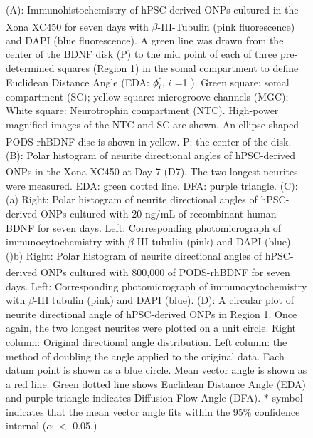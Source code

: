 \documentclass[review]{elsarticle}
\begin{document}
\begin{figure}
	\caption{(A): Immunohistochemistry of hPSC-derived ONPs cultured in the Xona\textsuperscript{\texttrademark} XC450 for seven days with $\beta$-III-Tubulin (pink fluorescence) and DAPI (blue fluorescence). A green line was drawn from the center of the BDNF disk (P) to the mid point of each of three pre-determined squares (Region 1) in the somal compartment to define Euclidean Distance Angle (EDA: $\phi^{`}_{i}$, $i$ =1 ). Green square: somal compartment (SC); yellow square:  microgroove channels (MGC); White square: Neurotrophin compartment (NTC). High-power magnified images of the NTC and SC are shown. An ellipse-shaped PODS\textsuperscript{\textregistered}-rhBDNF disc is shown in yellow. P: the center of the disk.(B): Polar histogram of  neurite directional angles of hPSC-derived ONPs in the Xona\textsuperscript{\texttrademark} XC450 at Day 7 (D7). The two longest neurites were measured. EDA: green dotted line. DFA: purple triangle. (C): (a) Right: Polar histogram of neurite directional angles of hPSC-derived ONPs cultured with 20 ng/mL of recombinant human BDNF for seven days. Left: Corresponding photomicrograph of immunocytochemistry with $\beta$-III tubulin (pink) and DAPI (blue). ()b) Right: Polar histogram of neurite directional angles of hPSC-derived ONPs cultured with 800,000 of PODS\textsuperscript{\textregistered}-rhBDNF for seven days. Left: Corresponding photomicrograph of immunocytochemistry with $\beta$-III tubulin (pink) and DAPI (blue). (D):  A circular plot of neurite directional angle of hPSC-derived ONPs in Region 1. Once again, the two longest neurites were plotted on a unit circle. Right column: Original directional angle distribution. Left column: the method of doubling the angle applied to the original data. Each datum point is shown as a blue circle. Mean vector angle is shown as a red line. Green dotted line shows Euclidean Distance Angle (EDA) and purple triangle indicates Diffusion Flow Angle (DFA). $\ast$ symbol indicates that the mean vector angle fits within the 95\% confidence internal ($\alpha$ $<$ 0.05.)}
\end{figure}
\end{document}
